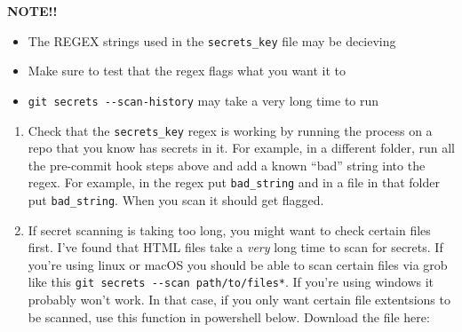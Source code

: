 \documentclass[
  letterpaper,
  DIV=11,
  numbers=noendperiod,
  oneside]{scrartcl}
\providecommand{\tightlist}{%
  \setlength{\itemsep}{0pt}\setlength{\parskip}{0pt}}\usepackage{longtable,booktabs,array}
\begin{document}
 \textbf{NOTE!!}

\begin{itemize}
\tightlist
\item
  The REGEX strings used in the \texttt{secrets\_key} file may be
  decieving
\item
  Make sure to test that the regex flags what you want it to
\item
  \texttt{git\ secrets\ -\/-scan-history} may take a very long time to
  run
\end{itemize}

\begin{enumerate}
\def\labelenumi{\arabic{enumi}.}
\item
  Check that the \texttt{secrets\_key} regex is working by running the
  process on a repo that you know has secrets in it. For example, in a
  different folder, run all the pre-commit hook steps above and add a
  known ``bad'' string into the regex. For example, in the regex put
  \texttt{bad\_string} and in a file in that folder put
  \texttt{bad\_string}. When you scan it should get flagged.
\item
  If secret scanning is taking too long, you might want to check certain
  files first. I've found that HTML files take a \emph{very} long time
  to scan for secrets. If you're using linux or macOS you should be able
  to scan certain files via grob like this
  \texttt{git\ secrets\ -\/-scan\ path/to/files*}. If you're using
  windows it probably won't work. In that case, if you only want certain
  file extentsions to be scanned, use this function in powershell below.
  Download the file here:
\end{enumerate}
\end{document}
